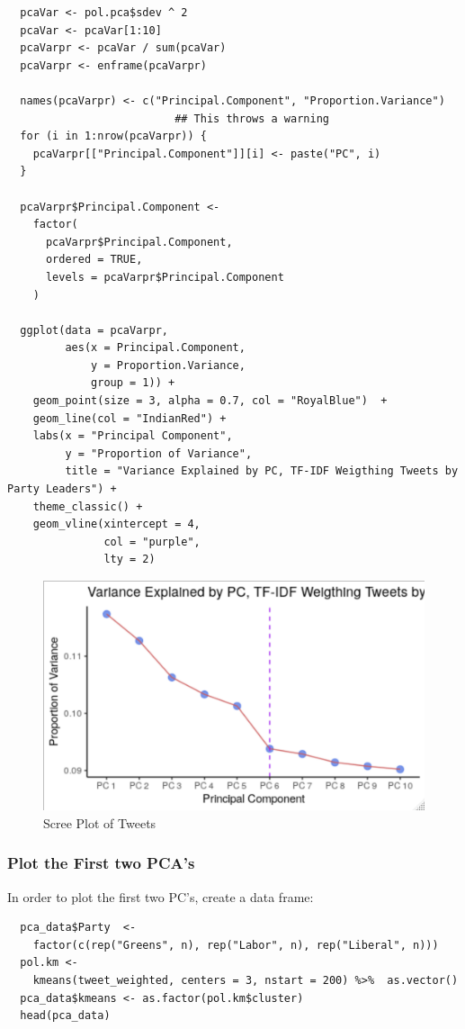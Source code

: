 \documentclass[11pt]{article}
\begin{document}
\begin{verbatim}
  pcaVar <- pol.pca$sdev ^ 2
  pcaVar <- pcaVar[1:10]
  pcaVarpr <- pcaVar / sum(pcaVar)
  pcaVarpr <- enframe(pcaVarpr)

  names(pcaVarpr) <- c("Principal.Component", "Proportion.Variance")
                          ## This throws a warning
  for (i in 1:nrow(pcaVarpr)) {
    pcaVarpr[["Principal.Component"]][i] <- paste("PC", i)
  }

  pcaVarpr$Principal.Component <-
    factor(
      pcaVarpr$Principal.Component,
      ordered = TRUE,
      levels = pcaVarpr$Principal.Component
    )

  ggplot(data = pcaVarpr,
         aes(x = Principal.Component,
             y = Proportion.Variance,
             group = 1)) +
    geom_point(size = 3, alpha = 0.7, col = "RoyalBlue")  +
    geom_line(col = "IndianRed") +
    labs(x = "Principal Component",
         y = "Proportion of Variance",
         title = "Variance Explained by PC, TF-IDF Weigthing Tweets by Party Leaders") +
    theme_classic() +
    geom_vline(xintercept = 4,
               col = "purple",
               lty = 2)
\end{verbatim}

\begin{figure}[htbp]
\centering
\includegraphics[width=.9\linewidth]{media/20200423115138578_255205396.png}
\caption{Scree Plot of Tweets}
\end{figure}

\subsubsection{Plot the First two PCA's}
\label{sec:org1151b7d}
In order to plot the first two PC's, create a data frame:

\begin{verbatim}
  pca_data$Party  <-
    factor(c(rep("Greens", n), rep("Labor", n), rep("Liberal", n)))
  pol.km <-
    kmeans(tweet_weighted, centers = 3, nstart = 200) %>%  as.vector()
  pca_data$kmeans <- as.factor(pol.km$cluster)
  head(pca_data)
\end{verbatim}
\end{document}
